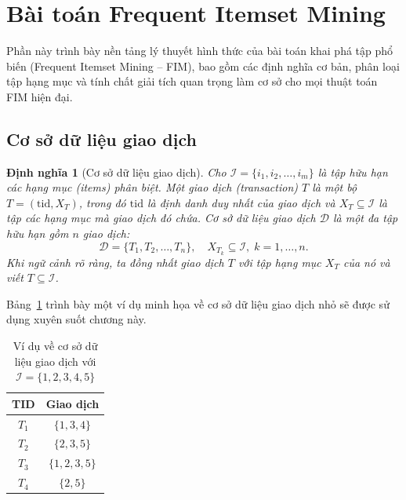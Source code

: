\documentclass[12pt,a4paper]{report}
\newtheorem{definition}{Định nghĩa}[chapter]
\begin{document}
\section{Bài toán Frequent Itemset Mining}
 
Phần này trình bày nền tảng lý thuyết hình thức của bài toán khai phá tập phổ biến
(Frequent Itemset Mining -- FIM), bao gồm các định nghĩa cơ bản, phân loại tập hạng
mục và tính chất giải tích quan trọng làm cơ sở cho mọi thuật toán FIM hiện đại.
 
\subsection{Cơ sở dữ liệu giao dịch}
 
\begin{definition}[Cơ sở dữ liệu giao dịch]
Cho $\mathcal{I} = \{i_1, i_2, \dots, i_m\}$ là tập hữu hạn các \textit{hạng mục}
(items) phân biệt. Một \textit{giao dịch} (transaction) $T$ là một bộ
$T = (\mathrm{tid}, X_T)$, trong đó $\mathrm{tid}$ là định danh duy nhất của giao
dịch và $X_T \subseteq \mathcal{I}$ là tập các hạng mục mà giao dịch đó chứa.
\textit{Cơ sở dữ liệu giao dịch} $\mathcal{D}$ là một đa tập hữu hạn gồm $n$
giao dịch:
\begin{equation}
    \mathcal{D} = \{T_1, T_2, \dots, T_n\}, \quad X_{T_k} \subseteq \mathcal{I},\;
    k = 1,\dots,n.
    \label{eq:database}
\end{equation}
Khi ngữ cảnh rõ ràng, ta đồng nhất giao dịch $T$ với tập hạng mục $X_T$ của nó
và viết $T \subseteq \mathcal{I}$.
\end{definition}
 
Bảng~\ref{tab:example-db} trình bày một ví dụ minh họa về cơ sở dữ liệu giao dịch
nhỏ sẽ được sử dụng xuyên suốt chương này.
 
\begin{table}[H]
    \centering
    \caption{Ví dụ về cơ sở dữ liệu giao dịch với $\mathcal{I} = \{1,2,3,4,5\}$}
    \label{tab:example-db}
    \begin{tabular}{cc}
        \toprule
        \textbf{TID} & \textbf{Giao dịch} \\
        \midrule
        $T_1$ & $\{1, 3, 4\}$ \\
        $T_2$ & $\{2, 3, 5\}$ \\
        $T_3$ & $\{1, 2, 3, 5\}$ \\
        $T_4$ & $\{2, 5\}$ \\
        \bottomrule
    \end{tabular}
\end{table}
 
\end{document}
